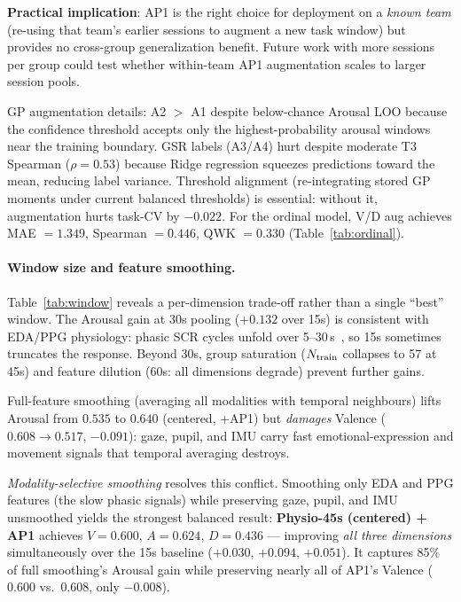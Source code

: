 \documentclass[sigconf,nonacm]{acmart}
\begin{document}
\textbf{Practical implication}: AP1 is the right choice for deployment on a
\emph{known team} (re-using that team's earlier sessions to augment a new task
window) but provides no cross-group generalization benefit.
Future work with more sessions per group could test whether within-team AP1
augmentation scales to larger session pools.

GP augmentation details: A2 $>$ A1 despite below-chance Arousal LOO because the
confidence threshold accepts only the highest-probability arousal windows near
the training boundary.
GSR labels (A3/A4) hurt despite moderate T3 Spearman ($\rho{=}0.53$) because
Ridge regression squeezes predictions toward the mean, reducing label variance.
Threshold alignment (re-integrating stored GP moments under current balanced
thresholds) is essential: without it, augmentation hurts task-CV by $-0.022$.
For the ordinal model, V/D aug achieves MAE $=1.349$, Spearman $=0.446$, QWK $=0.330$
(Table~\ref{tab:ordinal}).

\paragraph{Window size and feature smoothing.}
Table~\ref{tab:window} reveals a per-dimension trade-off rather than a single
``best'' window.
The Arousal gain at 30s pooling ($+0.132$ over 15s) is consistent with EDA/PPG
physiology: phasic SCR cycles unfold over
5--30\,s~\cite{kreibig2010autonomic}, so 15s sometimes truncates the response.
Beyond 30s, group saturation ($N_{\rm train}$ collapses to 57 at 45s)
and feature dilution (60s: all dimensions degrade) prevent further gains.

Full-feature smoothing (averaging all modalities with temporal neighbours)
lifts Arousal from $0.535$ to $0.640$ (centered, +AP1) but \emph{damages}
Valence ($0.608 \to 0.517$, $-0.091$): gaze, pupil, and IMU carry fast
emotional-expression and movement signals that temporal averaging destroys.

\textit{Modality-selective smoothing} resolves this conflict.
Smoothing only EDA and PPG features (the slow phasic signals) while preserving
gaze, pupil, and IMU unsmoothed yields the strongest balanced result:
\textbf{Physio-45s (centered) + AP1} achieves $V{=}0.600$, $A{=}0.624$,
$D{=}0.436$ --- improving \emph{all three dimensions} simultaneously over
the 15s baseline ($+0.030$, $+0.094$, $+0.051$).
It captures 85\% of full smoothing's Arousal gain while preserving nearly all
of AP1's Valence ($0.600$ vs.\ $0.608$, only $-0.008$).
\end{document}
